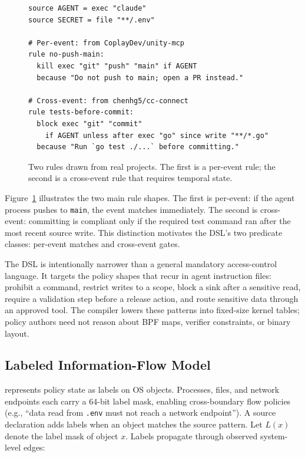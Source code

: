 \begin{figure}[t]
\begin{verbatim}
source AGENT = exec "claude"
source SECRET = file "**/.env"

# Per-event: from CoplayDev/unity-mcp
rule no-push-main:
  kill exec "git" "push" "main" if AGENT
  because "Do not push to main; open a PR instead."

# Cross-event: from chenhg5/cc-connect
rule tests-before-commit:
  block exec "git" "commit"
    if AGENT unless after exec "go" since write "**/*.go"
  because "Run `go test ./...` before committing."
\end{verbatim}
\caption{Two \sys{} rules drawn from real projects. The first is a
per-event rule; the second is a cross-event rule that requires temporal
state.}
\label{fig:policy-example}
\end{figure}

Figure~\ref{fig:policy-example} illustrates the two main rule shapes. The
first is per-event: if the agent process pushes to \texttt{main}, the
event matches immediately. The second is cross-event: committing is
compliant only if the required test command ran after the most recent
source write. This distinction motivates the DSL's two predicate
classes: per-event matches and cross-event gates.

The DSL is intentionally narrower than a general mandatory access-control
language. It targets the policy shapes that recur in agent instruction
files: prohibit a command, restrict writes to a scope, block a sink after
a sensitive read, require a validation step before a release action, and
route sensitive data through an approved tool. The compiler lowers these
patterns into fixed-size kernel tables; policy authors need not reason
about BPF maps, verifier constraints, or binary layout.

\subsection{Labeled Information-Flow Model}
\label{sec:ifc}

\sys{} represents policy state as labels on OS objects. Processes, files,
and network endpoints each carry a 64-bit label mask, enabling
cross-boundary flow policies (e.g., ``data read from \texttt{.env} must
not reach a network endpoint''). A source declaration adds labels when an
object matches the source pattern. Let $L(x)$ denote
the label mask of object $x$. Labels propagate through observed
system-level edges:

